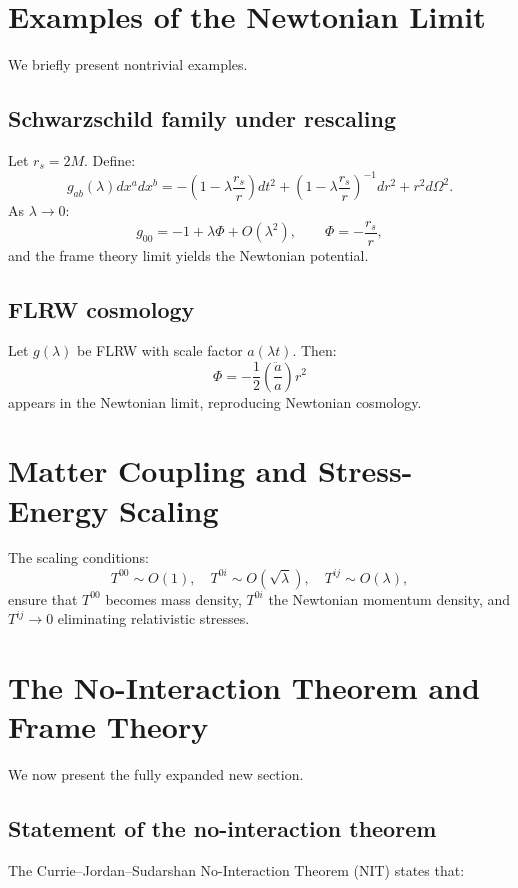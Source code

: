 \documentclass[12pt]{article}
\begin{document}
\section{Examples of the Newtonian Limit}

We briefly present nontrivial examples.

\subsection{Schwarzschild family under rescaling}

Let $r_s=2M$.
Define:
\[
g_{ab}(\lambda)dx^adx^b
 = -\left(1 - \lambda\frac{r_s}{r}\right)dt^2
   + \left(1 - \lambda\frac{r_s}{r}\right)^{-1}dr^2
   + r^2 d\Omega^2.
\]
As $\lambda\to0$:
\[
g_{00}=-1+\lambda\Phi+O(\lambda^2),
\qquad 
\Phi = -\frac{r_s}{r},
\]
and the frame theory limit yields the Newtonian potential.

\subsection{FLRW cosmology}

Let $g(\lambda)$ be FLRW with scale factor $a(\lambda t)$.
Then:
\[
\Phi = -\frac{1}{2}\left(\frac{\ddot a}{a}\right)r^2
\]
appears in the Newtonian limit, reproducing Newtonian cosmology.


\section{Matter Coupling and Stress-Energy Scaling}

The scaling conditions:
\[
T^{00}\sim O(1), \quad 
T^{0i}\sim O(\sqrt{\lambda}), \quad
T^{ij}\sim O(\lambda),
\]
ensure that $T^{00}$ becomes mass density, $T^{0i}$ the Newtonian momentum 
density, and $T^{ij}\to0$ eliminating relativistic stresses.


\section{The No-Interaction Theorem and Frame Theory}
\label{sec:NIT}

We now present the fully expanded new section.

\subsection{Statement of the no-interaction theorem}

The Currie--Jordan--Sudarshan No-Interaction Theorem (NIT) states that:
\end{document}
